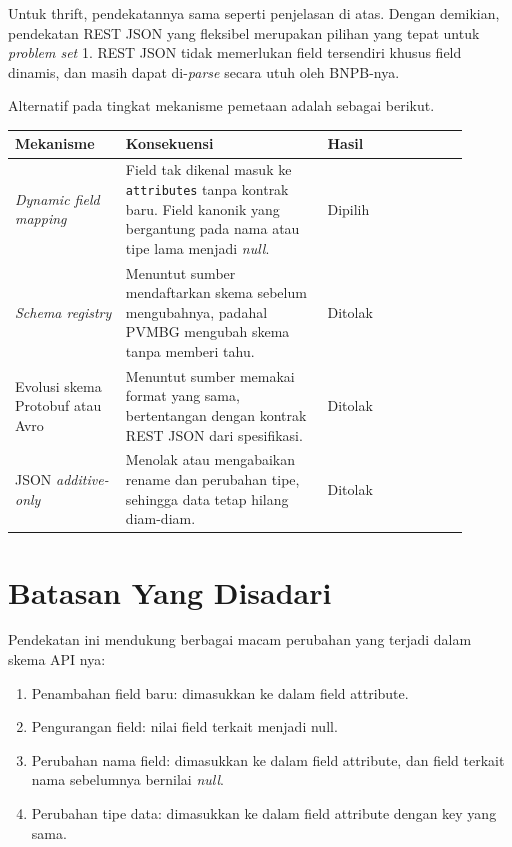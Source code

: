 Untuk thrift, pendekatannya sama seperti penjelasan di atas. Dengan demikian, pendekatan REST JSON yang fleksibel merupakan pilihan yang tepat untuk \emph{problem set} 1. REST JSON tidak memerlukan field tersendiri khusus field dinamis, dan masih dapat di-\emph{parse} secara utuh oleh BNPB-nya.


Alternatif pada tingkat mekanisme pemetaan adalah sebagai berikut.

\begin{longtable}[]{|>{\raggedright\arraybackslash}p{0.22\linewidth}|>{\raggedright\arraybackslash}p{0.4\linewidth}|>{\raggedright\arraybackslash}p{0.28\linewidth}|}
\hline
Mekanisme & Konsekuensi & Hasil \\
\hline
\endhead
\textit{Dynamic field mapping} & Field tak dikenal masuk ke \texttt{attributes} tanpa kontrak baru. Field kanonik yang bergantung pada nama atau tipe lama menjadi \textit{null}. & Dipilih \\
\hline
\textit{Schema registry} & Menuntut sumber mendaftarkan skema sebelum mengubahnya, padahal PVMBG mengubah skema tanpa memberi tahu. & Ditolak \\
\hline
Evolusi skema Protobuf atau Avro & Menuntut sumber memakai format yang sama, bertentangan dengan kontrak REST JSON dari spesifikasi. & Ditolak \\
\hline
JSON \textit{additive-only} & Menolak atau mengabaikan rename dan perubahan tipe, sehingga data tetap hilang diam-diam. & Ditolak \\
\hline
\end{longtable}

\section{Batasan Yang Disadari}

Pendekatan ini mendukung berbagai macam perubahan yang terjadi dalam skema API nya:

\begin{enumerate}
\def\labelenumi{\arabic{enumi}.}
\tightlist
\item
  Penambahan field baru: dimasukkan ke dalam field attribute.\\
\item
  Pengurangan field: nilai field terkait menjadi null.\\
\item
  Perubahan nama field: dimasukkan ke dalam field attribute, dan field terkait nama sebelumnya bernilai \emph{null}.\\
\item
  Perubahan tipe data: dimasukkan ke dalam field attribute dengan key yang sama.
\end{enumerate}

